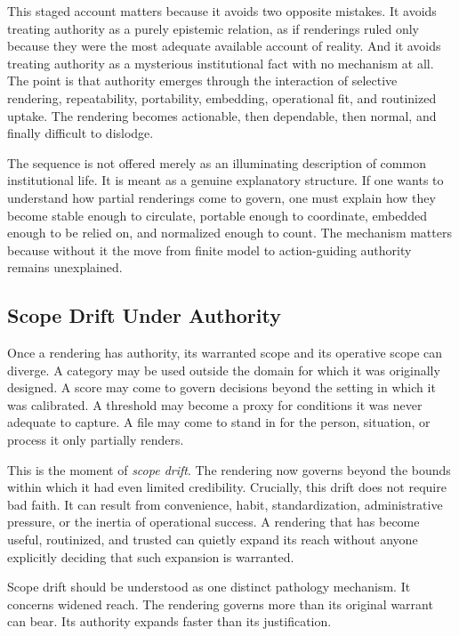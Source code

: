 \documentclass[11pt]{article}
\renewcommand{\emph}[1]{\textit{#1}}
\begin{document}
This staged account matters because it avoids two opposite mistakes. It avoids treating authority as a purely epistemic relation, as if renderings ruled only because they were the most adequate available account of reality. And it avoids treating authority as a mysterious institutional fact with no mechanism at all. The point is that authority emerges through the interaction of selective rendering, repeatability, portability, embedding, operational fit, and routinized uptake. The rendering becomes actionable, then dependable, then normal, and finally difficult to dislodge.

The sequence is not offered merely as an illuminating description of common institutional life. It is meant as a genuine explanatory structure. If one wants to understand how partial renderings come to govern, one must explain how they become stable enough to circulate, portable enough to coordinate, embedded enough to be relied on, and normalized enough to count. The mechanism matters because without it the move from finite model to action-guiding authority remains unexplained.

\subsection{Scope Drift Under Authority}

Once a rendering has authority, its warranted scope and its operative scope can diverge. A category may be used outside the domain for which it was originally designed. A score may come to govern decisions beyond the setting in which it was calibrated. A threshold may become a proxy for conditions it was never adequate to capture. A file may come to stand in for the person, situation, or process it only partially renders.\cite{Scott1998SeeingLikeState,BowkerStar1999SortingThingsOut,SelbstEtAl2019FairnessAbstraction}

This is the moment of \emph{scope drift}. The rendering now governs beyond the bounds within which it had even limited credibility. Crucially, this drift does not require bad faith. It can result from convenience, habit, standardization, administrative pressure, or the inertia of operational success. A rendering that has become useful, routinized, and trusted can quietly expand its reach without anyone explicitly deciding that such expansion is warranted.

Scope drift should be understood as one distinct pathology mechanism. It concerns widened reach. The rendering governs more than its original warrant can bear. Its authority expands faster than its justification.
\end{document}
